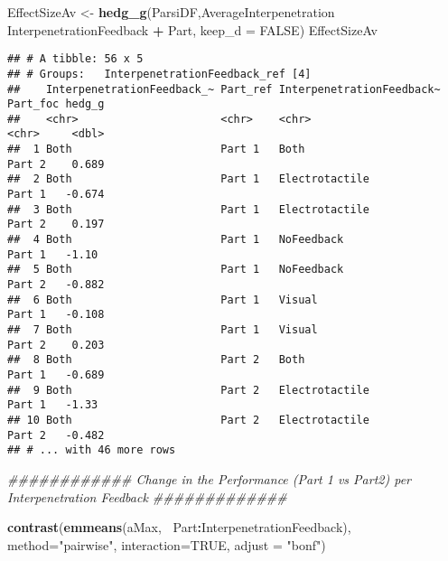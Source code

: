 \documentclass[
]{article}
\newenvironment{Shaded}{\begin{snugshade}}{\end{snugshade}}
\newcommand{\CommentTok}[1]{\textcolor[rgb]{0.56,0.35,0.01}{\textit{#1}}}
\newcommand{\DataTypeTok}[1]{\textcolor[rgb]{0.13,0.29,0.53}{#1}}
\newcommand{\KeywordTok}[1]{\textcolor[rgb]{0.13,0.29,0.53}{\textbf{#1}}}
\newcommand{\NormalTok}[1]{#1}
\newcommand{\OperatorTok}[1]{\textcolor[rgb]{0.81,0.36,0.00}{\textbf{#1}}}
\newcommand{\OtherTok}[1]{\textcolor[rgb]{0.56,0.35,0.01}{#1}}
\newcommand{\StringTok}[1]{\textcolor[rgb]{0.31,0.60,0.02}{#1}}
\begin{document}
\begin{Shaded}
\begin{Highlighting}[]
\NormalTok{EffectSizeAv <-}\StringTok{ }\KeywordTok{hedg_g}\NormalTok{(ParsiDF,AverageInterpenetration }\OperatorTok{~}\StringTok{ }\NormalTok{InterpenetrationFeedback }\OperatorTok{+}\StringTok{ }\NormalTok{Part, }\DataTypeTok{keep_d =} \OtherTok{FALSE}\NormalTok{)}
\NormalTok{EffectSizeAv}
\end{Highlighting}
\end{Shaded}

\begin{verbatim}
## # A tibble: 56 x 5
## # Groups:   InterpenetrationFeedback_ref [4]
##    InterpenetrationFeedback_~ Part_ref InterpenetrationFeedback~ Part_foc hedg_g
##    <chr>                      <chr>    <chr>                     <chr>     <dbl>
##  1 Both                       Part 1   Both                      Part 2    0.689
##  2 Both                       Part 1   Electrotactile            Part 1   -0.674
##  3 Both                       Part 1   Electrotactile            Part 2    0.197
##  4 Both                       Part 1   NoFeedback                Part 1   -1.10 
##  5 Both                       Part 1   NoFeedback                Part 2   -0.882
##  6 Both                       Part 1   Visual                    Part 1   -0.108
##  7 Both                       Part 1   Visual                    Part 2    0.203
##  8 Both                       Part 2   Both                      Part 1   -0.689
##  9 Both                       Part 2   Electrotactile            Part 1   -1.33 
## 10 Both                       Part 2   Electrotactile            Part 2   -0.482
## # ... with 46 more rows
\end{verbatim}

\begin{Shaded}
\begin{Highlighting}[]
\CommentTok{############ Change in the Performance (Part 1 vs Part2) per Interpenetration Feedback #############}

\KeywordTok{contrast}\NormalTok{(}\KeywordTok{emmeans}\NormalTok{(aMax,}\OperatorTok{~}\StringTok{ }\NormalTok{Part}\OperatorTok{:}\NormalTok{InterpenetrationFeedback), }
         \DataTypeTok{method=}\StringTok{"pairwise"}\NormalTok{, }\DataTypeTok{interaction=}\OtherTok{TRUE}\NormalTok{, }\DataTypeTok{adjust =} \StringTok{"bonf"}\NormalTok{)}
\end{Highlighting}
\end{Shaded}
\end{document}
